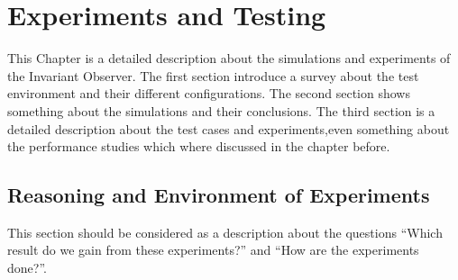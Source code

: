 \chapter{Experiments and Testing}
\label{chapter:4}

\ifpdf
    \graphicspath{{Chapter3/Figs/Raster/}{Chapter3/Figs/PDF/}{Chapter3/Figs/}}
\else
    \graphicspath{{Chapter3/Figs/Vector/}{Chapter3/Figs/}}
\fi

This Chapter is a detailed description about the simulations and experiments of the Invariant Observer.
The first section introduce a survey about the test environment and their different configurations.
The second section shows something about the simulations and their conclusions.
The third section is a detailed description about the test cases and experiments,even something about the performance studies which where
discussed in the chapter before. \\



\section{Reasoning and Environment of Experiments}
\label{chapter:4:section:1}
This section should be considered as a description about the questions ``Which result do we gain from these experiments?'' and ``How are the experiments done?''. 

